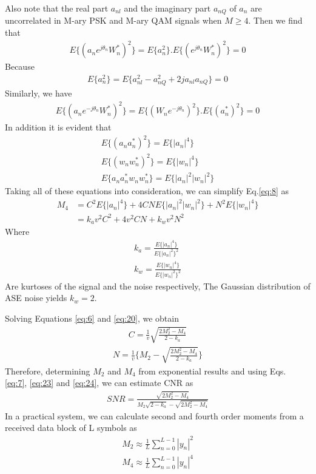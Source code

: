 \documentclass[12pt]{report}
\begin{document}
Also note that the real part $a_{nl}$ and the imaginary part $a_{nQ}$ of $a_n$ are uncorrelated in M-ary PSK and M-ary QAM signals when $M\geq 4$. Then we find that
\begin{align}
E\{(a_n e^{j\theta_n}W_n^*)^2\}=E\{a_n^2\}. E\{(e^{j\theta_n} W_n^*)^2\}=0
\end{align}
Because
\begin{align}
E\{a_n^2\}=E\{a_{nl}^2-a_{nQ}^2+2ja_{nl} a_{nQ}\}=0
\end{align}
Similarly, we have
\begin{align}
E\{(a_n e^{-j\theta_n}W_n^*)^2\}=E\{(W_n e^{-j\theta_n})^2\}.E\{(a_n^*)^2\}=0
\end{align}
In addition it is evident that
\begin{align}
E\{(a_n a_n^*)^2\}=E\{|a_n|^4\}\\
E\{(w_n w_n^*)^2\}=E\{|w_n|^4\}\\
E\{a_n a_n^* w_n w_n^*\}=E\{|a_n|^2 |w_n|^2\}
\end{align}
Taking all of these equations into consideration, we can simplify Eq.\ref{eq:8} as
\begin{equation}\label{eq:20}
	\begin{aligned}
		M_4&=C^2E\{|a_n|^4\}+4CNE\{|a_n|^2 |w_n|^2\}+N^2E\{|w_n|^4\}\\
		&=k_a v^2 C^2 +4v^2CN+k_w v^2N^2
	\end{aligned}
\end{equation}
Where
\begin{align}
	k_a=\frac{E\{|a_n|^4\}}{E\{|a_n|^2\}^2}\\
	k_w=\frac{E\{|w_n|^4\}}{E\{|w_n|^2\}^2}
\end{align}
Are kurtoses of the signal and the noise respectively, The Gaussian distribution of ASE noise yields $k_w=2$.

Solving Equations \ref{eq:6} and \ref{eq:20}, we obtain
\begin{align}\label{eq:23}
	C=\frac{1}{v} \sqrt{\frac{2M_2^2 -M_4}{2-k_a}}
	\end{align}
\begin{align}\label{eq:24}
	N=\frac{1}{v}\{M_2- \sqrt{\frac{2M_2^2 -M_4}{2-k_a}}\}
\end{align}
Therefore, determining $M_2$ and $M_4$ from exponential results and using Eqs. \ref{eq:7}, \ref{eq:23} and \ref{eq:24}, we can estimate CNR as
\begin{align}\label{eq:snr}
	SNR=\frac{\sqrt{2M_2^2 -M_4}}{M_2\sqrt{2-k_a}-\sqrt{2M_2^2 -M_4}}
\end{align}
In a practical system, we can calculate second and fourth order moments from a received data block of L symbols as
\begin{align}\label{eq:m2}
M_2\approx\frac{1}{L}\sum_{n=0}^{L-1}|y_n|^2
\end{align}
\begin{align}\label{eq:m4}
M_4\approx\frac{1}{L}\sum_{n=0}^{L-1}|y_n|^4
\end{align}
\end{document}
